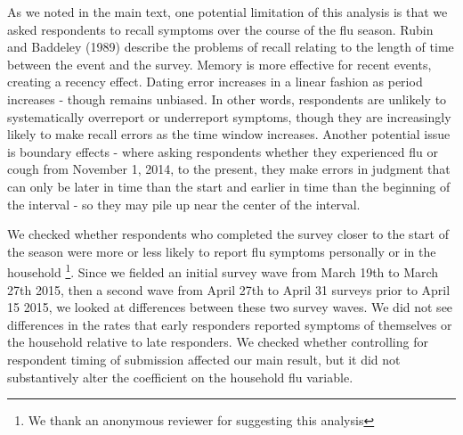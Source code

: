\documentclass[12pt]{article}
\begin{document}
As we noted in the main text, one potential limitation of this analysis is that we asked respondents to recall symptoms over the course of the flu season. Rubin and Baddeley (1989) describe the problems of recall relating to the length of time between the event and the survey. Memory is more effective for recent events, creating a recency effect. Dating error increases in a linear fashion as period increases - though remains unbiased. In other words, respondents are unlikely to systematically overreport or underreport symptoms, though they are increasingly likely to make recall errors as the time window increases. Another potential issue is boundary effects - where asking respondents whether they experienced flu or cough from November 1, 2014, to the present, they make errors in judgment that can only be later in time than the start and earlier in time than the beginning of the interval - so they may pile up near the center of the interval.

We checked whether respondents who completed the survey closer to the start of the season were more or less likely to report flu symptoms personally or in the household \footnote{We thank an anonymous reviewer for suggesting this analysis}. Since we fielded an initial survey wave from March 19th to March 27th 2015, then a second wave from April 27th to April 31 surveys prior to April 15 2015, we looked at differences between these two survey waves. We did not see differences in the rates that early responders reported symptoms of themselves or the household relative to late responders. We checked whether controlling for respondent timing of submission affected our main result, but it did not substantively alter the coefficient on the household flu variable.
\end{document}
